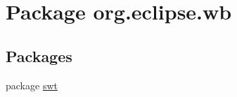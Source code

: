 \hypertarget{namespaceorg_1_1eclipse_1_1wb}{\section{Package org.\-eclipse.\-wb}
\label{namespaceorg_1_1eclipse_1_1wb}
}
\subsection*{Packages}
\begin{DoxyCompactItemize}
\item 
package \hyperlink{namespaceorg_1_1eclipse_1_1wb_1_1swt}{swt}
\end{DoxyCompactItemize}
